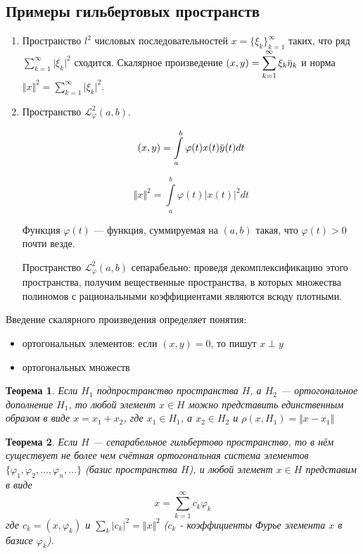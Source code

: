 \documentclass[12pt,a4paper,titlepage,oneside]{book}
\newcommand{\overbar}[1]{\mkern 1.5mu\overline{\mkern-1.5mu#1\mkern-1.5mu}\mkern 1.5mu}
\theoremstyle{definition}
\theoremstyle{plain}
\newtheorem*{theorem}{Теорема}
\theoremstyle{remark}
\theoremstyle{remark}
\theoremstyle{remark}
\theoremstyle{remark}
\theoremstyle{plain}
\theoremstyle{plain}
\begin{document}
\subsection*{Примеры гильбертовых пространств}

\begin{enumerate}
	\item Пространство $l^2$ числовых последовательностей $x = \lbrace \xi_k \rbrace_{k=1}^{\infty}$ таких, что ряд $\displaystyle\sum_{k=1}^{\infty} \lvert \xi_k \rvert^2$ сходится. Скалярное произведение $(x, y) = \displaystyle\sum_{k=1}^{\infty} \xi_k \overbar{\eta}_k$ и норма $\Vert x \Vert^2 = \displaystyle\sum_{k=1}^{\infty} \lvert \xi_k \rvert^2$.
	
	\item Пространство $\mathcal{L}_{\varphi}^2 (a, b)$.
	
	$$ (x, y) = \displaystyle\int\limits_a^b \varphi(t) x(t) \overbar{y}(t) dt$$
	
	$$ \Vert x \Vert^2 = \displaystyle\int\limits_a^b \varphi(t) \lvert x(t) \rvert^2 dt$$
	
	Функция $\varphi(t)$ --- функция, суммируемая на $(a, b)$ такая, что $\varphi(t) > 0$ почти везде.
	
	Пространство $\mathcal{L}_{\varphi}^2 (a, b)$ сепарабельно: проведя декомплексификацию этого пространства, получим вещественные пространства, в которых множества полиномов с рациональными коэффициентами являются всюду плотными.
\end{enumerate}

Введение скалярного произведения определяет понятия:

\begin{itemize}
	\item ортогональных элементов: если $(x, y) = 0$, то пишут $x \perp y$
	
	\item ортогональных множеств
\end{itemize}

\begin{theorem}
	Если $H_1$ подпространство пространства $H$, а $H_2$ --- ортогональное дополнение $H_1$, то любой элемент $x \in H$ можно представить единственным образом в виде $x = x_1 + x_2$, где $x_1 \in H_1$, а $x_2 \in H_2$ и $\rho(x, H_1) = \Vert x - x_1 \Vert$
\end{theorem}

\begin{theorem}
	Если $H$ --- сепарабельное гильбертово пространство, то в нём существует не более чем счётная ортогональная система элементов $\lbrace \varphi_1, \varphi_2, \ldots, \varphi_n, \ldots \rbrace$ (базис пространства $H$), и любой элемент $x \in H$ представим в виде 
	$$x = \displaystyle\sum_{k=1}^{\infty} c_k \varphi_k$$
	где $c_k = (x, \varphi_k)$ и $\displaystyle\sum_{k} \lvert c_k \rvert^2 = \Vert x \Vert^2$ ($c_k$ - коэффициенты Фурье элемента $x$ в базисе $\varphi_k$).
\end{theorem}
\end{document}
